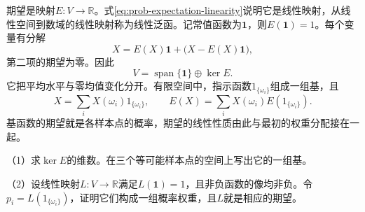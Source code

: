 期望是映射\(E:V\to\mathbb R\)。式\eqref{eq:prob-expectation-linearity}说明它是线性映射，从线性空间到数域的线性映射称为{\heiti 线性泛函}。记常值函数为\(\mathbf1\)，则\(E(\mathbf1)=1\)。每个变量有分解
\[
 X=E(X)\mathbf1+\bigl(X-E(X)\mathbf1\bigr),
\]
第二项的期望为零。因此
\[
 V=\operatorname{span}\{\mathbf1\}\oplus\ker E.
\]
它把平均水平与零均值变化分开。有限空间中，指示函数\(1_{\{\omega_i\}}\)组成一组基，且
\[
 X=\sum_iX(\omega_i)1_{\{\omega_i\}},\qquad
 E(X)=\sum_iX(\omega_i)E(1_{\{\omega_i\}}).
\]
基函数的期望就是各样本点的概率，期望的线性性质由此与最初的权重分配接在一起。

\begin{exercise}
\mbox{}\par\nobreak

（1）求\(\ker E\)的维数。在三个等可能样本点的空间上写出它的一组基。

（2）设线性映射\(L:V\to\mathbb R\)满足\(L(\mathbf1)=1\)，且非负函数的像均非负。令\(p_i=L(1_{\{\omega_i\}})\)，证明它们构成一组概率权重，且\(L\)就是相应的期望。
\end{exercise}
